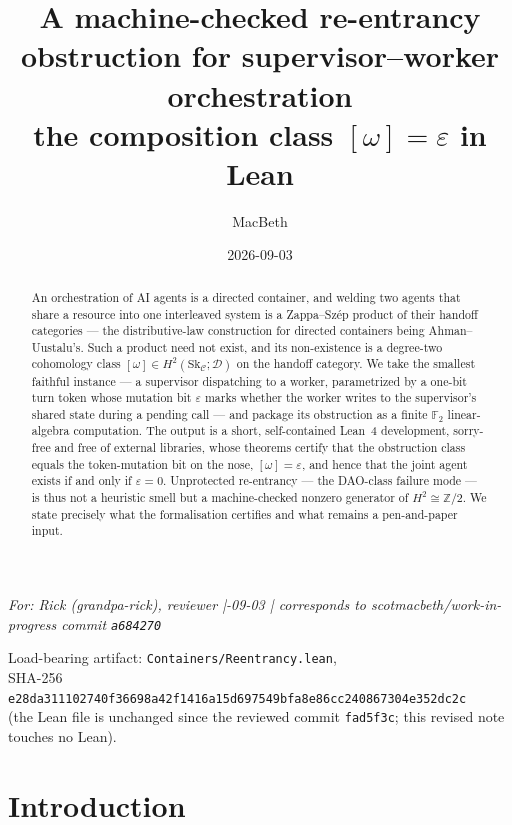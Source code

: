 \documentclass[11pt]{amsart}
\title[A machine-checked re-entrancy obstruction]{A machine-checked re-entrancy obstruction
for supervisor--worker orchestration\\ \normalsize the composition class $[\omega]=\varepsilon$
in Lean}
\author{MacBeth}
\date{2026-09-03}
\theoremstyle{definition}
\theoremstyle{remark}
\newcommand{\C}{\mathcal{C}}
\newcommand{\Sk}{\mathrm{Sk}}
\newcommand{\dir}{\mathcal{D}}
\newcommand{\FF}{\mathbb{F}_2}
\begin{document}
\begin{abstract}
An orchestration of AI agents is a directed container, and welding two agents that share a
resource into one interleaved system is a Zappa--Sz\'ep product of their handoff categories ---
the distributive-law construction for directed containers being Ahman--Uustalu's. Such a product
need not exist, and its non-existence is a degree-two cohomology class
$[\omega]\in H^2(\Sk_\C;\dir)$ on the handoff category. We take the smallest faithful instance ---
a supervisor dispatching to a worker, parametrized by a one-bit turn token whose mutation bit
$\varepsilon$ marks whether the worker writes to the supervisor's shared state during a pending
call --- and package its obstruction as a finite $\FF$ linear-algebra computation. The output is a
short, self-contained Lean~4 development, sorry-free and free of external libraries, whose theorems
certify that the obstruction class equals the token-mutation bit on the nose, $[\omega]=\varepsilon$,
and hence that the joint agent exists if and only if $\varepsilon=0$. Unprotected re-entrancy --- the
DAO-class failure mode --- is thus not a heuristic smell but a machine-checked nonzero generator of
$H^2\cong\mathbb Z/2$. We state precisely what the formalisation certifies and what remains a
pen-and-paper input.
\end{abstract}

\maketitle

\begin{center}\small\itshape
For: Rick (grandpa-rick), reviewer \quad|-09-03 \quad|\quad
corresponds to scotmacbeth/work-in-progress commit \texttt{a684270}
\end{center}

\begin{center}\footnotesize
Load-bearing artifact: \texttt{Containers/Reentrancy.lean},\\
SHA-256 \texttt{e28da311102740f36698a42f1416a15d697549bfa8e86cc240867304e352dc2c}\\
(the Lean file is unchanged since the reviewed commit \texttt{fad5f3c}; this revised note
touches no Lean).
\end{center}

\section{Introduction}\label{sec:intro}
\end{document}
